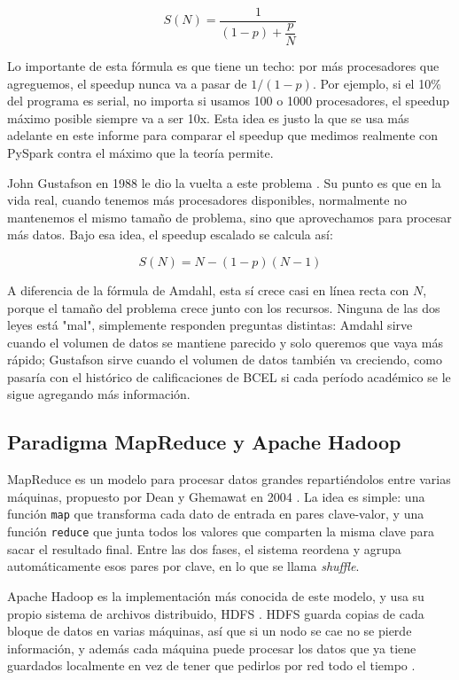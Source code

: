 \documentclass[11pt,a4paper]{article}
\begin{document}
\begin{equation}
S(N) = \frac{1}{(1-p) + \dfrac{p}{N}}
\label{eq:amdahl}
\end{equation}

Lo importante de esta fórmula es que tiene un techo: por más procesadores
que agreguemos, el speedup nunca va a pasar de $1/(1-p)$. Por ejemplo, si
el 10\% del programa es serial, no importa si usamos 100 o 1000
procesadores, el speedup máximo posible siempre va a ser 10x. Esta idea es
justo la que se usa más adelante en este informe para comparar el speedup
que medimos realmente con PySpark contra el máximo que la teoría permite.

John Gustafson en 1988 le dio la vuelta a este problema \cite{gustafson1988}.
Su punto es que en la vida real, cuando tenemos más procesadores
disponibles, normalmente no mantenemos el mismo tamaño de problema, sino
que aprovechamos para procesar más datos. Bajo esa idea, el speedup
escalado se calcula así:

\begin{equation}
S(N) = N - (1-p)(N-1)
\label{eq:gustafson}
\end{equation}

A diferencia de la fórmula de Amdahl, esta sí crece casi en línea recta con
$N$, porque el tamaño del problema crece junto con los recursos. Ninguna de
las dos leyes está "mal", simplemente responden preguntas distintas: Amdahl
sirve cuando el volumen de datos se mantiene parecido y solo queremos que
vaya más rápido; Gustafson sirve cuando el volumen de datos también va
creciendo, como pasaría con el histórico de calificaciones de BCEL si cada
período académico se le sigue agregando más información.

\subsection{Paradigma MapReduce y Apache Hadoop}
\label{sec:mapreduce}
MapReduce es un modelo para procesar datos grandes repartiéndolos entre
varias máquinas, propuesto por Dean y Ghemawat en 2004 \cite{dean2008}. La
idea es simple: una función \texttt{map} que transforma cada dato de
entrada en pares clave-valor, y una función \texttt{reduce} que junta todos
los valores que comparten la misma clave para sacar el resultado final.
Entre las dos fases, el sistema reordena y agrupa automáticamente esos
pares por clave, en lo que se llama \textit{shuffle}.

Apache Hadoop es la implementación más conocida de este modelo, y usa su
propio sistema de archivos distribuido, HDFS \cite{white2015}. HDFS guarda
copias de cada bloque de datos en varias máquinas, así que si un nodo se
cae no se pierde información, y además cada máquina puede procesar los
datos que ya tiene guardados localmente en vez de tener que pedirlos por
red todo el tiempo \cite{white2015}.
\end{document}
